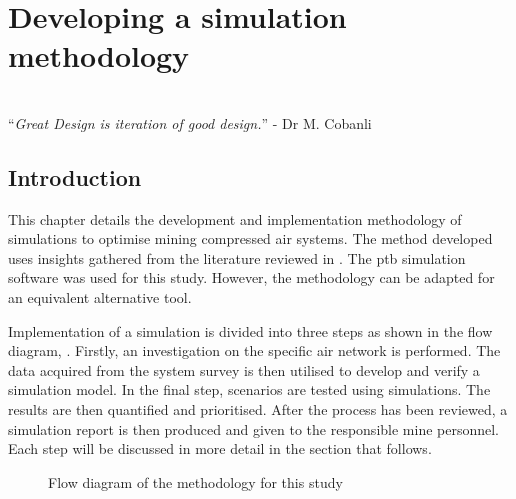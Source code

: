 \chapter{Developing a simulation methodology}
\thispagestyle{empty}
\vspace{40em}
\hrulefill
\\
\enquote{\textit{Great Design is iteration of good design.}} - Dr M. Cobanli\\
\newpage
\section{Introduction}
This chapter details the development and implementation methodology of simulations to optimise mining compressed air systems. The method developed uses insights gathered from the literature reviewed in . The \gls{ptb} simulation software was used for this study. However, the methodology can be adapted for an equivalent alternative tool.
\par 
Implementation of a simulation is divided into three steps as shown in the flow diagram, . Firstly, an investigation on the specific air network is performed. The data acquired from the system survey is then utilised to develop and verify a simulation model. In the final step, scenarios are tested using simulations. The results are then quantified and prioritised. After the process has been reviewed, a simulation report is then produced and given to the responsible mine personnel. Each step will be discussed in more detail in the section that follows.

\begin{figure}[h]
	\centering
	\caption{Flow diagram of the methodology for this study}
	\label{fig: Methodology}
\end{figure}
